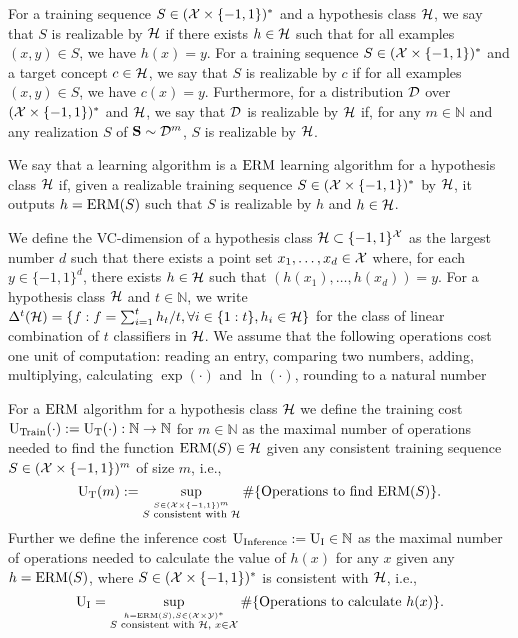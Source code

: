 For a training sequence $ S\in(\mathcal{X}\times \{-1,1\})^{*} $ and a hypothesis class $ \mathcal{H} $, we say that $ S $ is realizable by $ \mathcal{H} $ if there exists $h\in\mathcal{H}  $ such that for all examples $(x,y) \in S $,  we have $ h(x)=y $.
For a training sequence $ S\in(\mathcal{X}\times \{-1,1\})^{*} $ and a target concept $ c\in \mathcal{H} $, we say that $ S $ is realizable by $ c $ if for all examples $(x,y) \in S $, we have $ c(x)=y $. Furthermore, for a distribution $ \mathcal{D} $ over $ (\mathcal{X}\times\{-1,1\})^{*} $ and $ \mathcal{H} $, we say that $ \mathcal{D} $ is realizable by $ \mathcal{H} $ if, for any $ m\in\mathbb{N} $ and any realization $ S $ of $ \mathbf{S}\sim \mathcal{D}^{m} $, $ S$ is realizable by $ \mathcal{H} $.          

We say that a learning algorithm is a $ \mathrm{ERM} $ learning algorithm for a hypothesis class $ \mathcal{H} $  if, given a realizable training sequence $ S \in(\mathcal{X}\times\{-1,1\})^{*}$ by $ \mathcal{H} $, it outputs $h=\mathrm{ERM}(S) $ such that $ S $ is realizable by $ h $ and $ h\in \mathcal{H} $.   

We define the VC-dimension of a hypothesis class $ \mathcal{H}\subset \{ -1,1 \}^{\mathcal{X}} $ as the largest number $ d $ such that there exists a point set $ x_1,\ldots,x_d \in \mathcal{X}$ where, for each $ y\in\{ -1,1 \}^{d} $, there exists $ h\in \mathcal{H} $ such that $ (h(x_1),\ldots,h(x_{d}))=y$. For a hypothesis class $ \mathcal{H} $ and  $t\in\mathbb{N}$, we write $\Delta^{t}(\mathcal{H})=\{f:f=\sum_{i=1}^{t} h_{t}/t, \forall i\in\{1:t\}, h_{i}\in \mathcal{H}\}$ for the class of linear combination of $ t $ classifiers in $ \mathcal{H} $.       
We assume that the following operations cost one unit of computation: reading an entry, comparing two numbers, adding, multiplying, calculating $\exp(\cdot)$ and $\ln{\left(\cdot \right)}$, rounding to a natural number


For a $ \mathrm{ERM} $ algorithm for a hypothesis class $ \mathcal{H} $  we define the training cost  $ \text{U}_{\text{Train}}(\cdot):=\operatorname{U_{T}}(\cdot):\mathbb{N}\rightarrow\mathbb{N}$ for $ m\in\mathbb{N} $    as the maximal number of operations needed to find the function $ \mathrm{ERM}(S) \in \mathcal{H}$ given any consistent training sequence $S\in (\mathcal{X}\times\{-1,1\})^{m}$ of size $ m $, i.e.,    $$\operatorname{U_{T}}(m):=\sup_{\stackrel{S\in (\mathcal{X}\times\{-1,1\})^{m}}{S \text{ consistent with } \mathcal{H}}} \# \{ \text{Operations to}\text{ find } \mathrm{ERM}(S)  \}.$$  Further we define the inference cost $\text{U}_{\text{Inference}}:= \operatorname{U_{I}}\in \mathbb{N}$ as the maximal number of operations needed to calculate the value of $ h(x) $ for any $ x $ given any $ h=\mathrm{ERM}(S)$, where $ S\in (\mathcal{X}\times \{-1,1\})^{*} $ is consistent with $ \mathcal{H} $, i.e., 
$$\operatorname{U_{I}}=\sup_{\stackrel{h=\mathrm{ERM}(S), S\in (\mathcal{X}\times\mathcal{Y})^{*}}{S \text{ consistent with } \mathcal{H},\text{ }x\in\mathcal{X}}} \# \{ \text{Operations to calculate } h(x)  \}.$$

